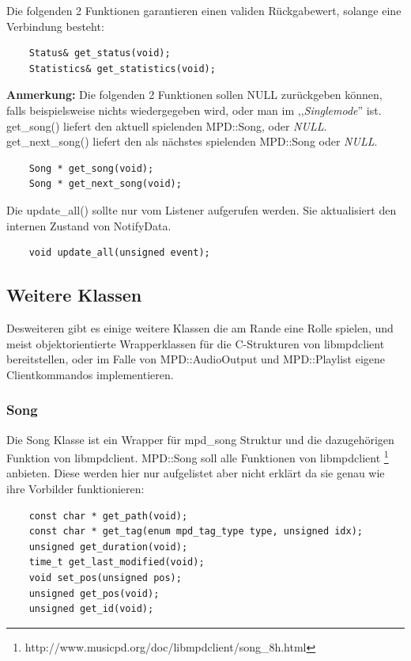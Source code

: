 Die folgenden 2 Funktionen garantieren einen validen Rückgabewert, solange eine Verbindung besteht:
\begin{verbatim}
    Status& get_status(void);
    Statistics& get_statistics(void);
\end{verbatim}

\textbf{Anmerkung:} Die folgenden 2 Funktionen sollen NULL zurückgeben können, falls beispielsweise
nichts wiedergegeben wird, oder man im ,,\textit{Singlemode}'' ist.
get\_song() liefert den aktuell spielenden MPD::Song, oder \emph{NULL}.
get\_next\_song() liefert den als nächstes spielenden MPD::Song oder \emph{NULL}.
\begin{verbatim} 
    Song * get_song(void);
    Song * get_next_song(void);
\end{verbatim}

Die update\_all() sollte nur vom Listener aufgerufen werden. Sie aktualisiert den internen Zustand
von NotifyData.
\begin{verbatim}
    void update_all(unsigned event);
\end{verbatim}


\subsection{Weitere Klassen}
%
%
%

Desweiteren gibt es einige weitere Klassen die am Rande eine Rolle spielen,
und meist objektorientierte Wrapperklassen für die C-Strukturen von libmpdclient bereitstellen,
oder im Falle von MPD::AudioOutput und MPD::Playlist eigene Clientkommandos implementieren.

\subsubsection{Song}

Die Song Klasse ist ein Wrapper für mpd\_song Struktur und die dazugehörigen Funktion von libmpdclient. 
MPD::Song soll alle Funktionen von libmpdclient \footnote{http://www.musicpd.org/doc/libmpdclient/song\_8h.html} anbieten.
Diese werden hier nur aufgelistet aber nicht erklärt da sie genau wie ihre Vorbilder funktionieren:

\begin{verbatim}
    const char * get_path(void);
    const char * get_tag(enum mpd_tag_type type, unsigned idx);
    unsigned get_duration(void);
    time_t get_last_modified(void);
    void set_pos(unsigned pos);
    unsigned get_pos(void);
    unsigned get_id(void);
\end{verbatim}

